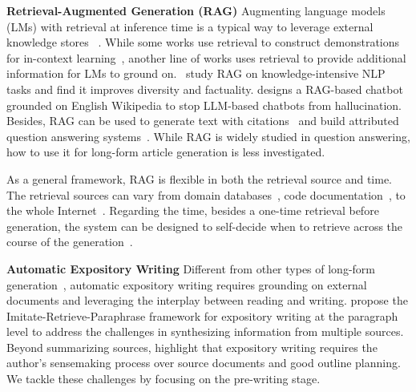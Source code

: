 \label{sec:related_work}
\noindent
\textbf{Retrieval-Augmented Generation (RAG)}\quad
Augmenting language models (LMs) with retrieval at inference time is a typical way to leverage external knowledge stores%
~\citep{ram2023ralm,JMLR:v24:23-0037}. While some works use retrieval to construct demonstrations for in-context learning~\citep{li-etal-2023-unified,liu-etal-2022-makes,agrawal-etal-2023-context,poesia2022synchromesh,shi-etal-2022-nearest,khattab2022demonstrate}, another line of works uses retrieval to provide additional information for LMs to ground on.~\citet{lewis2020retrieval} study RAG on knowledge-intensive NLP tasks and find it improves diversity and factuality. \citet{semnani-etal-2023-wikichat} designs a RAG-based chatbot grounded on English Wikipedia to stop LLM-based chatbots from hallucination. Besides, RAG can be used to generate text with citations~\citep{menick2022teaching,gao-etal-2023-enabling} and build attributed question answering systems~\citep{bohnet2023attributed}. %
While RAG is widely studied in question answering, how to use it for long-form article generation is less investigated.%

As a general framework, RAG is flexible in both the retrieval source and time. The retrieval sources can vary from domain databases~\citep{zakka2023almanac}, code documentation~\citep{zhou2023docprompting}, to the whole Internet~\citep{nakano2022webgpt,komeili-etal-2022-internet}. Regarding the time, %
besides a one-time retrieval before generation, the system can be designed to self-decide when %
to retrieve across the course of the generation~\citep{jiang-etal-2023-active, parisi2022talm,shuster-etal-2022-language,yao2023react}. %



\noindent
\textbf{Automatic Expository Writing}\quad
Different from other types of long-form generation~\citep{yang-etal-2022-re3, feng2018topic}, %
automatic expository writing requires grounding on external documents and leveraging the interplay between reading and writing. \citet{balepur-etal-2023-expository} propose the Imitate-Retrieve-Paraphrase framework for expository writing at the paragraph level to address the challenges in synthesizing information from multiple sources. Beyond summarizing sources, 
\citet{shen2023summarization} highlight that expository writing requires the author's sensemaking process over source documents and good outline planning. We tackle these challenges by focusing on the pre-writing stage.


